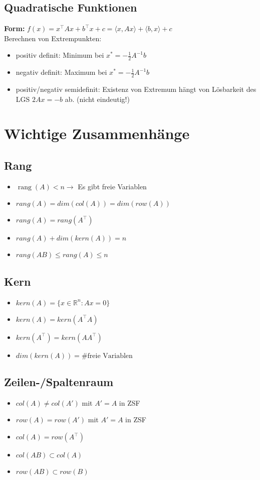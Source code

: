 \documentclass[german, 6pt]{latex4ei/latex4ei_sheet}
\DeclareMathOperator{\rang}{rang}
\begin{document}
\subsection{Quadratische Funktionen}
\textbf{Form:} $f(x)=x^{\top}Ax+b^{\top}x+c = \langle x,Ax \rangle + \langle b,x \rangle + c$\\
Berechnen von Extrempunkten:
\begin{itemize}\itemsep0pt
\item positiv definit: Minimum bei $x^{*}=-\frac{1}{2}A^{-1}b$
\item negativ definit: Maximum bei $x^{*}=-\frac{1}{2}A^{-1}b$
\item positiv/negativ semidefinit: Existenz von Extremum hängt von Lösbarkeit des LGS $2Ax=-b$ ab. (nicht eindeutig!)
\end{itemize}

\begin{minipage}{\columnwidth}
\section{Wichtige Zusammenhänge}
\subsection{Rang}
\begin{itemize}
	\item $\rang(A)<n \rightarrow$ Es gibt freie Variablen
	\item $rang(A)=dim(col(A))=dim(row(A))$
	\item $rang(A)=rang(A^\top)$
	\item $rang(A)+dim(kern(A))=n$
	\item $rang(AB)\leq rang(A) \leq n$
\end{itemize}
\end{minipage}
\subsection{Kern}
\begin{itemize}
	\item $kern(A)=\{x\in \mathbb{R}^n: Ax=0\}$
	\item $kern(A)=kern(A^\top A)$
	\item $kern(A^\top) = kern(AA^\top )$
	\item $dim(kern(A))=\text{\#freie Variablen}$
\end{itemize}
\subsection{Zeilen-/Spaltenraum}
\begin{itemize}
	\item $col(A)\neq col(A')$ mit $A'=A$ in ZSF
	\item $row(A)=row(A')$ mit $A'=A$ in ZSF
	\item $col(A)=row(A^\top)$
	\item $col(AB)\subset col(A)$
	\item $row(AB)\subset row(B)$
\end{itemize}
\end{document}
